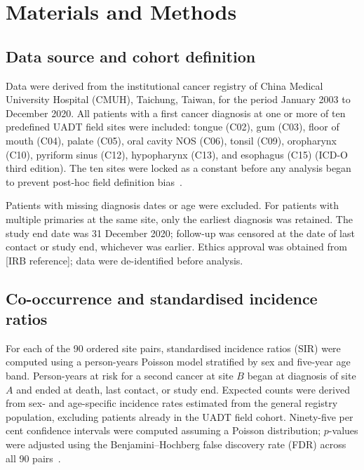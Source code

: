 \documentclass[12pt,a4paper]{article}
\begin{document}
\section{Materials and Methods}

\subsection{Data source and cohort definition}

Data were derived from the institutional cancer registry of China Medical
University Hospital (CMUH), Taichung, Taiwan, for the period January 2003
to December 2020.
All patients with a first cancer diagnosis at one or more of ten predefined
UADT field sites were included: tongue (C02), gum (C03), floor of mouth (C04),
palate (C05), oral cavity NOS (C06), tonsil (C09), oropharynx (C10),
pyriform sinus (C12), hypopharynx (C13), and esophagus (C15) (ICD-O third edition).
The ten sites were locked as a constant before any analysis began to prevent
post-hoc field definition bias~\citep{ioannidis2014}.

Patients with missing diagnosis dates or age were excluded. For patients with
multiple primaries at the same site, only the earliest diagnosis was retained.
The study end date was 31 December 2020; follow-up was censored at the date of
last contact or study end, whichever was earlier.
Ethics approval was obtained from [IRB reference]; data were de-identified before
analysis.

\subsection{Co-occurrence and standardised incidence ratios}

For each of the 90 ordered site pairs, standardised incidence ratios (SIR) were
computed using a person-years Poisson model stratified by sex and five-year age
band. Person-years at risk for a second cancer at site $B$ began at diagnosis of
site $A$ and ended at death, last contact, or study end.
Expected counts were derived from sex- and age-specific incidence rates estimated
from the general registry population, excluding patients already in the UADT
field cohort.
Ninety-five per cent confidence intervals were computed assuming a Poisson
distribution; $p$-values were adjusted using the Benjamini--Hochberg false
discovery rate (FDR) across all 90 pairs~\citep{benjamini1995}.
\end{document}
